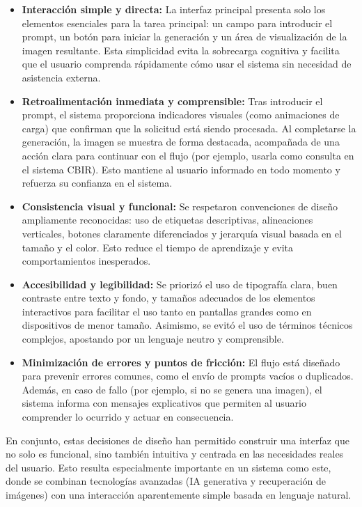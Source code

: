 \begin{itemize}
    \item \textbf{Interacción simple y directa:} La interfaz principal presenta solo los elementos esenciales para la tarea principal: un campo para introducir el prompt, un botón para iniciar la generación y un área de visualización de la imagen resultante. Esta simplicidad evita la sobrecarga cognitiva y facilita que el usuario comprenda rápidamente cómo usar el sistema sin necesidad de asistencia externa.

    \item \textbf{Retroalimentación inmediata y comprensible:} Tras introducir el prompt, el sistema proporciona indicadores visuales (como animaciones de carga) que confirman que la solicitud está siendo procesada. Al completarse la generación, la imagen se muestra de forma destacada, acompañada de una acción clara para continuar con el flujo (por ejemplo, usarla como consulta en el sistema CBIR). Esto mantiene al usuario informado en todo momento y refuerza su confianza en el sistema.

    \item \textbf{Consistencia visual y funcional:} Se respetaron convenciones de diseño ampliamente reconocidas: uso de etiquetas descriptivas, alineaciones verticales, botones claramente diferenciados y jerarquía visual basada en el tamaño y el color. Esto reduce el tiempo de aprendizaje y evita comportamientos inesperados.

    \item \textbf{Accesibilidad y legibilidad:} Se priorizó el uso de tipografía clara, buen contraste entre texto y fondo, y tamaños adecuados de los elementos interactivos para facilitar el uso tanto en pantallas grandes como en dispositivos de menor tamaño. Asimismo, se evitó el uso de términos técnicos complejos, apostando por un lenguaje neutro y comprensible.

    \item \textbf{Minimización de errores y puntos de fricción:} El flujo está diseñado para prevenir errores comunes, como el envío de prompts vacíos o duplicados. Además, en caso de fallo (por ejemplo, si no se genera una imagen), el sistema informa con mensajes explicativos que permiten al usuario comprender lo ocurrido y actuar en consecuencia.
\end{itemize}

En conjunto, estas decisiones de diseño han permitido construir una interfaz que no solo es funcional, sino también intuitiva y centrada en las necesidades reales del usuario. Esto resulta especialmente importante en un sistema como este, donde se combinan tecnologías avanzadas (IA generativa y recuperación de imágenes) con una interacción aparentemente simple basada en lenguaje natural.
